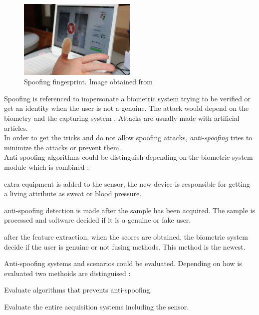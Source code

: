 \begin{figure}[htb]
\centering
\includegraphics[width=0.5\textwidth]{images_miscelaneus/spoofing_fingerprint.jpg}
\caption{Spoofing fingerprint. Image obtained from \cite{fingerprint_image}} \label{fig:Spoof_fingerprint}
\end{figure}

Spoofing is referenced to impersonate a biometric system trying to be verified or get an identity when the user is not a genuine. The attack would depend on the biometry and the capturing system \cite{Spoofing_survey}. Attacks are usually made with artificial articles.\\

In order to get the tricks and do not allow spoofing attacks, \textit{anti-spoofing} tries to minimize the attacks or prevent them.\\

Anti-spoofing algorithms could be distinguish depending on the biometric system module which is combined \cite{Spoofing_survey}:
\begin{description}[noitemsep,topsep=8pt,parsep=0pt,partopsep=20pt]
\item[Sensor level:] extra equipment is added to the sensor, the new device is responsible for getting a living attribute as sweat or blood pressure.
\item[Feature level:] anti-spoofing detection is made after the sample has been acquired. The sample is processed and software decided if it is a genuine or fake user.
\item[Score level:] after the feature extraction, when the scores are obtained, the biometric system decide if the user is genuine or not fusing methods. This method is the newest.
\end{description}


Anti-spoofing systems and scenarios could be evaluated. Depending on how is evaluated two methoids are distinguised \cite{Spoofing_survey}:
\begin{description}[noitemsep,topsep=8pt,parsep=0pt,partopsep=20pt]
\item[Algorithm-based or technology evaluation:] Evaluate algorithms that prevents anti-spoofing.
\item[System-based or scenario evaluation:] Evaluate the entire acquisition systems including the sensor.
\end{description}

